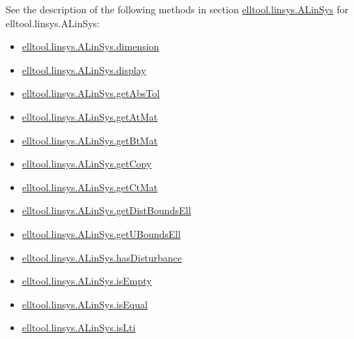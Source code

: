 \documentclass[letterpaper,10pt,english]{sphinxmanual}
\begin{document}
See the description of the following methods in section
{\hyperref[chap_func:elltool-linsys-alinsys]{elltool.linsys.ALinSys}} for elltool.linsys.ALinSys:
\begin{itemize}
\item {} 
{\hyperref[chap_func:elltool-linsys-alinsys-dimension]{elltool.linsys.ALinSys.dimension}}

\item {} 
{\hyperref[chap_func:elltool-linsys-alinsys-display]{elltool.linsys.ALinSys.display}}

\item {} 
{\hyperref[chap_func:elltool-linsys-alinsys-getabstol]{elltool.linsys.ALinSys.getAbsTol}}

\item {} 
{\hyperref[chap_func:elltool-linsys-alinsys-getatmat]{elltool.linsys.ALinSys.getAtMat}}

\item {} 
{\hyperref[chap_func:elltool-linsys-alinsys-getbtmat]{elltool.linsys.ALinSys.getBtMat}}

\item {} 
{\hyperref[chap_func:elltool-linsys-alinsys-getcopy]{elltool.linsys.ALinSys.getCopy}}

\item {} 
{\hyperref[chap_func:elltool-linsys-alinsys-getctmat]{elltool.linsys.ALinSys.getCtMat}}

\item {} 
{\hyperref[chap_func:elltool-linsys-alinsys-getdistboundsell]{elltool.linsys.ALinSys.getDistBoundsEll}}

\item {} 
{\hyperref[chap_func:elltool-linsys-alinsys-getuboundsell]{elltool.linsys.ALinSys.getUBoundsEll}}

\item {} 
{\hyperref[chap_func:elltool-linsys-alinsys-hasdisturbance]{elltool.linsys.ALinSys.hasDisturbance}}

\item {} 
{\hyperref[chap_func:elltool-linsys-alinsys-isempty]{elltool.linsys.ALinSys.isEmpty}}

\item {} 
{\hyperref[chap_func:elltool-linsys-alinsys-isequal]{elltool.linsys.ALinSys.isEqual}}

\item {} 
{\hyperref[chap_func:elltool-linsys-alinsys-islti]{elltool.linsys.ALinSys.isLti}}

\end{itemize}
\end{document}
